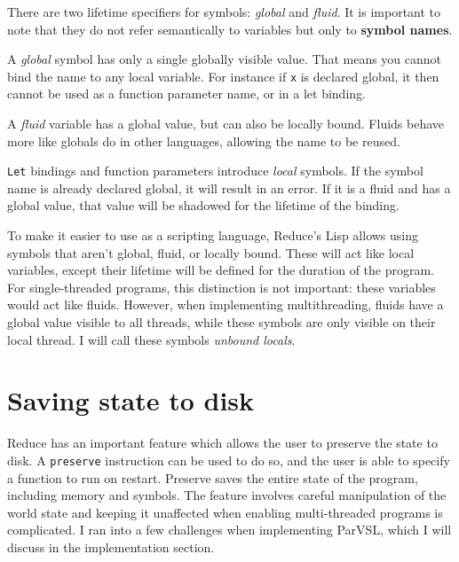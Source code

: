 There are two lifetime specifiers for symbols: \emph{global} and \emph{fluid}. It is important to note that they
do not refer semantically to variables but only to \textbf{symbol names}.

A \emph{global} symbol has only a single globally visible value. That means you cannot bind the name to any local
variable. For instance if \texttt{x} is declared global, it then cannot be used as a function parameter name, or in a
let binding.

A \emph{fluid} variable has a global value, but can also be locally bound. Fluids behave more like globals do
in other languages, allowing the name to be reused.

\texttt{Let} bindings and function parameters introduce \emph{local} symbols. If the symbol name is already declared global,
it will result in an error. If it is a fluid and has a global value, that value will be shadowed for the lifetime
of the binding.

To make it easier to use as a scripting language, Reduce's Lisp allows using symbols that aren't global, fluid,
or locally bound. These will act like local variables, except their lifetime will be defined for the duration of the
program. For single-threaded programs, this distinction is not important: these variables would act like fluids. However,
when implementing multithreading, fluids have a global value visible to all threads, while these symbols are only
visible on their local thread. I will call these symbols \emph{unbound locals}.

\section{Saving state to disk}
Reduce has an important feature which allows the user to preserve the state to disk. A \texttt{preserve} instruction can be
used to do so, and the user is able to specify a function to run on restart. Preserve saves the entire state of the
program, including memory and symbols. The feature involves careful manipulation of the world state and keeping it
unaffected when enabling multi-threaded programs is complicated. I ran into a few challenges when implementing ParVSL,
which I will discuss in the implementation section.
